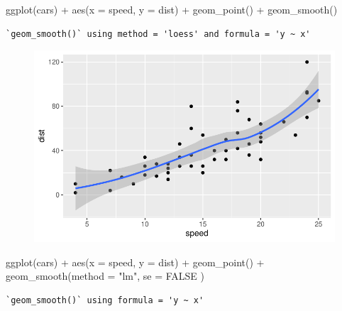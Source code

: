 \documentclass[
  letterpaper,
  DIV=11,
  numbers=noendperiod]{scrartcl}
\newenvironment{Shaded}{\begin{snugshade}}{\end{snugshade}}
\newcommand{\AttributeTok}[1]{\textcolor[rgb]{0.40,0.45,0.13}{#1}}
\newcommand{\ConstantTok}[1]{\textcolor[rgb]{0.56,0.35,0.01}{#1}}
\newcommand{\FunctionTok}[1]{\textcolor[rgb]{0.28,0.35,0.67}{#1}}
\newcommand{\NormalTok}[1]{\textcolor[rgb]{0.00,0.23,0.31}{#1}}
\newcommand{\SpecialCharTok}[1]{\textcolor[rgb]{0.37,0.37,0.37}{#1}}
\newcommand{\StringTok}[1]{\textcolor[rgb]{0.13,0.47,0.30}{#1}}
\begin{document}
\begin{Shaded}
\begin{Highlighting}[]
\FunctionTok{ggplot}\NormalTok{(cars) }\SpecialCharTok{+}
  \FunctionTok{aes}\NormalTok{(}\AttributeTok{x =}\NormalTok{ speed, }\AttributeTok{y =}\NormalTok{ dist) }\SpecialCharTok{+}
  \FunctionTok{geom\_point}\NormalTok{() }\SpecialCharTok{+}
  \FunctionTok{geom\_smooth}\NormalTok{()}
\end{Highlighting}
\end{Shaded}

\begin{verbatim}
`geom_smooth()` using method = 'loess' and formula = 'y ~ x'
\end{verbatim}

\begin{figure}[H]

{\centering \includegraphics{class05_files/figure-pdf/unnamed-chunk-5-1.pdf}

}

\end{figure}

\begin{Shaded}
\begin{Highlighting}[]
\FunctionTok{ggplot}\NormalTok{(cars) }\SpecialCharTok{+}
  \FunctionTok{aes}\NormalTok{(}\AttributeTok{x =}\NormalTok{ speed, }\AttributeTok{y =}\NormalTok{ dist) }\SpecialCharTok{+}
  \FunctionTok{geom\_point}\NormalTok{() }\SpecialCharTok{+}
  \FunctionTok{geom\_smooth}\NormalTok{(}\AttributeTok{method =} \StringTok{"lm"}\NormalTok{, }\AttributeTok{se =} \ConstantTok{FALSE}\NormalTok{ )}
\end{Highlighting}
\end{Shaded}

\begin{verbatim}
`geom_smooth()` using formula = 'y ~ x'
\end{verbatim}
\end{document}
